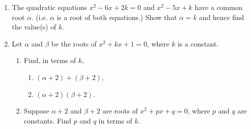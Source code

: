 \documentclass[11pt]{article}
\begin{document}
\begin{enumerate}
        \hrulefill
            
            \hrulefill
            
            \hrulefill
            
            \hrulefill
            
            \hrulefill
            
            \hrulefill
            
            \hrulefill
            
            \hrulefill
            
            \hrulefill
            
            \hrulefill
            
            \hrulefill

        \item The quadratic equations $x^2-6x+2k=0$ and $x^2-5x+k$ have a common root $\alpha$. (i.e. $\alpha$ is a root of both equations.) Show that $\alpha=k$ and hence find the value(s) of $k$.
        
        \hrulefill

            \hrulefill
            
            \hrulefill
            
            \hrulefill
            
            \hrulefill
            
            \hrulefill
            
            \hrulefill
            
            \hrulefill
            
            \hrulefill
            
            \hrulefill
            
            \hrulefill
            
            \hrulefill

        \pagebreak
        \item Let $\alpha$ and $\beta$ be the roots of $x^2+kx+1=0$, where $k$ is a constant.\begin{enumerate}
            \item Find, in terms of $k$,\begin{enumerate}
                \item $(\alpha+2)+(\beta+2)$,
                \item $(\alpha+2)(\beta+2)$.
            \end{enumerate}
            \item Suppose $\alpha+2$ and $\beta+2$ are roots of $x^2+px+q=0$, where $p$ and $q$ are constants. Find $p$ and $q$ in terms of $k$.
        \end{enumerate}


\end{enumerate}
\end{document}
